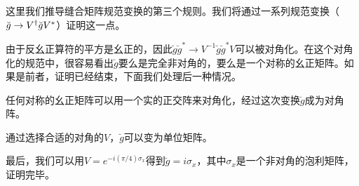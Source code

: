 这里我们推导缝合矩阵规范变换的第三个规则。我们将通过一系列规范变换（$\breve{g}\rightarrow V^{\scriptstyle{\dagger}}\breve{g}V^*$）证明这一点。

 由于反幺正算符的平方是幺正的，因此$\breve{g}\breve{g}^* \rightarrow V^{-1}\breve{g}\breve{g}^*V$可以被对角化。在这个对角化的规范中，很容易看出$\breve{g}$要么是完全非对角的，要么是一个对称的幺正矩阵。如果是前者，证明已经结束，下面我们处理后一种情况。

 任何对称的幺正矩阵可以用一个实的正交阵来对角化，经过这次变换$\breve{g}$成为对角阵。

 通过选择合适的对角的$V$，$\breve{g}$可以变为单位矩阵。

 最后，我们可以用$V=e^{-i(\pi/4)\sigma_x}$得到$\breve{g}=i\sigma_x$，其中$\sigma_x$是一个非对角的泡利矩阵，证明完毕。\\
